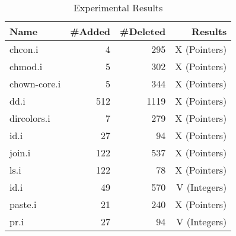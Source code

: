 \begin{table}[htbp]
  \footnotesize
  \centering
  \caption{Experimental Results}
    \begin{tabular}{lrrr}
    \hline
    \textbf{Name} & \textbf{ \#Added } & \textbf{ \#Deleted } & \textbf{ Results } \\
    \hline
                chcon.i  & 4    & 295    & X (Pointers) \\
                chmod.i  & 5    & 302    & X (Pointers) \\
                chown-core.i  & 5    & 344    & X (Pointers) \\
                dd.i  & 512    & 1119    & X (Pointers) \\
                dircolors.i  & 7    & 279    & X (Pointers) \\
                id.i  & 27    & 94    & X (Pointers) \\
                join.i  & 122    & 537    & X (Pointers) \\
                ls.i  & 122    & 78    & X (Pointers) \\
                id.i  & 49    & 570    & V (Integers) \\
                paste.i  & 21    & 240    & X (Pointers) \\
                pr.i  & 27    & 94    & V (Integers) \\
                
    \hline
    \end{tabular}%
\end{table}%
